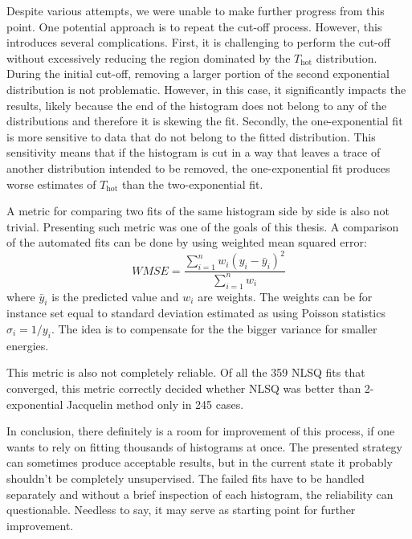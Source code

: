 Despite various attempts, we were unable to make further progress from this point. One potential approach is to repeat the cut-off process. However, this introduces several complications. First, it is challenging to perform the cut-off without excessively reducing the region dominated by the $T_\mathrm{hot}$ distribution. During the initial cut-off, removing a larger portion of the second exponential distribution is not problematic. However, in this case, it significantly impacts the results, likely because the end of the histogram does not belong to any of the distributions and therefore it is skewing the fit. Secondly, the one-exponential fit is more sensitive to data that do not belong to the fitted distribution. This sensitivity means that if the histogram is cut in a way that leaves a trace of another distribution intended to be removed, the one-exponential fit produces worse estimates of $T_\mathrm{hot}$ than the two-exponential fit.

A metric for comparing two fits of the same histogram side by side is also not trivial. Presenting such metric was one of the goals of this thesis. A comparison of the automated fits can be done by using weighted mean squared error:
\begin{equation}
	WMSE = \frac{\sum_{i=1}^{n}w_i(y_i-\bar{y}_i)^2}{\sum_{i=1}^{n}w_i}
\end{equation}
where $\bar{y}_i$ is the predicted value and $w_i$ are weights. The weights can be for instance set equal to standard deviation estimated as using Poisson statistics $\sigma_i = 1/y_i$. The idea is to compensate for the the bigger variance for smaller energies. 

This metric is also not completely reliable. Of all the 359 NLSQ fits that converged, this metric correctly decided whether NLSQ was better than 2-exponential Jacquelin method only in 245 cases.

In conclusion, there definitely is a room for improvement of this process, if one wants to rely on fitting thousands of histograms at once. The presented strategy can sometimes produce acceptable results, but in the current state it probably shouldn't be completely unsupervised. The failed fits have to be handled separately and without a brief inspection of each histogram, the reliability can questionable. Needless to say, it may serve as starting point for further improvement.

\newpage
